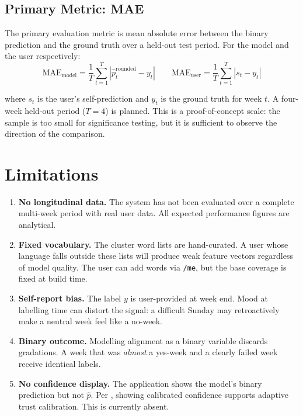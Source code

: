 \documentclass[11pt, a4paper]{report}
\begin{document}
\subsection{Primary Metric: MAE}

The primary evaluation metric is mean absolute error between the binary
prediction and the ground truth over a held-out test period. For the model
and the user respectively:
\begin{equation}
  \mathrm{MAE}_{\mathrm{model}}
  = \frac{1}{T}\sum_{t=1}^{T}|\hat{p}_t^{\mathrm{rounded}} - y_t|
  \qquad
  \mathrm{MAE}_{\mathrm{user}}
  = \frac{1}{T}\sum_{t=1}^{T}|s_t - y_t|
\end{equation}

where $s_t$ is the user's self-prediction and $y_t$ is the ground truth
for week $t$. A four-week held-out period ($T=4$) is planned. This is a
proof-of-concept scale: the sample is too small for significance testing,
but it is sufficient to observe the direction of the comparison.

\section{Limitations}

\begin{enumerate}
  \item \textbf{No longitudinal data.} The system has not been evaluated
    over a complete multi-week period with real user data. All expected
    performance figures are analytical.

  \item \textbf{Fixed vocabulary.} The cluster word lists are hand-curated.
    A user whose language falls outside these lists will produce weak
    feature vectors regardless of model quality. The user can add words
    via \texttt{/me}, but the base coverage is fixed at build time.

  \item \textbf{Self-report bias.} The label $y$ is user-provided at
    week end. Mood at labelling time can distort the signal: a difficult
    Sunday may retroactively make a neutral week feel like a no-week.

  \item \textbf{Binary outcome.} Modelling alignment as a binary variable
    discards gradations. A week that was \textit{almost} a yes-week and
    a clearly failed week receive identical labels.

  \item \textbf{No confidence display.} The application shows the model's
    binary prediction but not $\hat{p}$. Per \citet{hengstler2016},
    showing calibrated confidence supports adaptive trust calibration.
    This is currently absent.
\end{enumerate}
\end{document}
